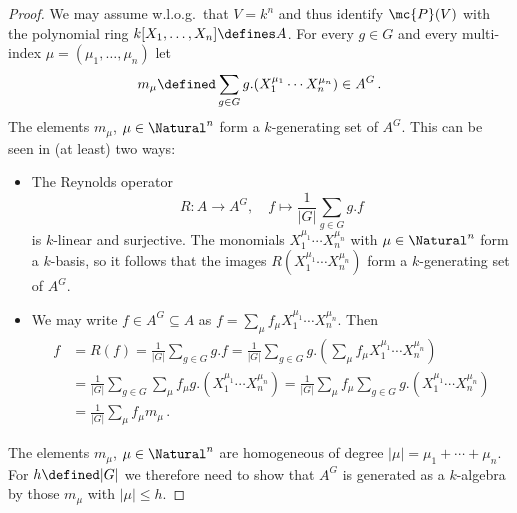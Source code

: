 \begin{proof}
  We may assume w.l.o.g.\ that $V = k^n$ and thus identify $\mc{P}(V)$ with the polynomial ring $k[X_1, \dotsc, X_n] \defines A$.
  For every $g \in G$ and every multi-index $\mu = (\mu_1, \dotsc, \mu_n)$ let
  \[
              m_\mu
    \defined  \sum_{g \in G} g.(X_1^{\mu_1} \dotsm X_n^{\mu_n})
    \in       A^G \,.
  \]
  The elements $m_\mu$, $\mu \in \Natural^n$ form a $k$-generating set of $A^G$.
  This can be seen in (at least) two ways:
  \begin{itemize}
    \item
      The Reynolds operator
      \[
                R
        \colon  A
        \to     A^G,
        \quad   f
        \mapsto \frac{1}{|G|} \sum_{g \in G} g.f
      \]
      is $k$-linear and surjective.
      The monomials $X_1^{\mu_1} \dotsm X_n^{\mu_n}$ with $\mu \in \Natural^n$ form a $k$-basis, so it follows that the images $R(X_1^{\mu_1} \dotsm X_n^{\mu_n})$ form a $k$-generating set of $A^G$.
    \item
      We may write $f \in A^G \subseteq A$ as $f = \sum_{\mu} f_\mu X_1^{\mu_1} \dotsm X_n^{\mu_n}$.
      Then
      \begin{align*}
            f
        &=  R(f)
         =  \frac{1}{|G|} \sum_{g \in G} g.f
         =  \frac{1}{|G|} \sum_{g \in G} g.\left( \sum_{\mu} f_\mu X_1^{\mu_1} \dotsm X_n^{\mu_n} \right) \\
        &=  \frac{1}{|G|} \sum_{g \in G} \sum_{\mu} f_\mu g.\left( X_1^{\mu_1} \dotsm X_n^{\mu_n} \right)
         =  \frac{1}{|G|} \sum_{\mu} f_\mu \sum_{g \in G} g.\left( X_1^{\mu_1} \dotsm X_n^{\mu_n} \right) \\
        &=  \frac{1}{|G|} \sum_{\mu} f_\mu m_\mu \,.
      \end{align*}
  \end{itemize}
  The elements $m_\mu$, $\mu \in \Natural^n$ are homogeneous of degree $|\mu| = \mu_1 + \dotsb + \mu_n$.
  For $h \defined |G|$ we therefore need to show that $A^G$ is generated as a $k$-algebra by those $m_\mu$ with $|\mu| \leq h$.
  

\end{proof}
